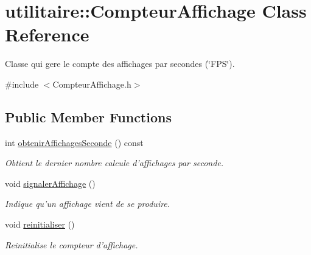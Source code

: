\hypertarget{classutilitaire_1_1_compteur_affichage}{\section{utilitaire\-:\-:Compteur\-Affichage Class Reference}
\label{classutilitaire_1_1_compteur_affichage}
}


Classe qui gere le compte des affichages par secondes (\char`\"{}\-F\-P\-S\char`\"{}).  




{\ttfamily \#include $<$Compteur\-Affichage.\-h$>$}

\subsection*{Public Member Functions}
\begin{DoxyCompactItemize}
\item 
int \hyperlink{classutilitaire_1_1_compteur_affichage_a1902a495b4898b3f7ab9056537db00cc}{obtenir\-Affichages\-Seconde} () const 
\begin{DoxyCompactList}\small\item\em Obtient le dernier nombre calcule d'affichages par seconde. \end{DoxyCompactList}\item 
void \hyperlink{classutilitaire_1_1_compteur_affichage_a49f6562d1a37e275ff8c8c0e9be41ab5}{signaler\-Affichage} ()
\begin{DoxyCompactList}\small\item\em Indique qu'un affichage vient de se produire. \end{DoxyCompactList}\item 
void \hyperlink{classutilitaire_1_1_compteur_affichage_a69b89a3d76cde700f1c08580bab010ca}{reinitialiser} ()
\begin{DoxyCompactList}\small\item\em Reinitialise le compteur d'affichage. \end{DoxyCompactList}\end{DoxyCompactItemize}
